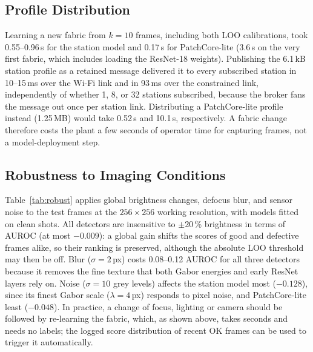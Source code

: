 \subsection{Profile Distribution}\label{sec:res-profile}
Learning a new fabric from $k=10$ frames, including both LOO calibrations, took 0.55--0.96\,s for the station model and 0.17\,s for PatchCore-lite (3.6\,s on the very first fabric, which includes loading the ResNet-18 weights). Publishing the 6.1\,kB station profile as a retained message delivered it to every subscribed station in 10--15\,ms over the Wi-Fi link and in 93\,ms over the constrained link, independently of whether 1, 8, or 32 stations subscribed, because the broker fans the message out once per station link. Distributing a PatchCore-lite profile instead (1.25\,MB) would take 0.52\,s and 10.1\,s, respectively. A fabric change therefore costs the plant a few seconds of operator time for capturing frames, not a model-deployment step.

\subsection{Robustness to Imaging Conditions}\label{sec:res-robust}
Table~\ref{tab:robust} applies global brightness changes, defocus blur, and sensor noise to the test frames at the $256\times256$ working resolution, with models fitted on clean shots. All detectors are insensitive to $\pm$20\,\% brightness in terms of AUROC (at most $-0.009$): a global gain shifts the scores of good and defective frames alike, so their ranking is preserved, although the absolute LOO threshold may then be off. Blur ($\sigma=2$\,px) costs 0.08--0.12 AUROC for all three detectors because it removes the fine texture that both Gabor energies and early ResNet layers rely on. Noise ($\sigma=10$ grey levels) affects the station model most ($-0.128$), since its finest Gabor scale ($\lambda=4$\,px) responds to pixel noise, and PatchCore-lite least ($-0.048$). In practice, a change of focus, lighting or camera should be followed by re-learning the fabric, which, as shown above, takes seconds and needs no labels; the logged score distribution of recent OK frames can be used to trigger it automatically.


